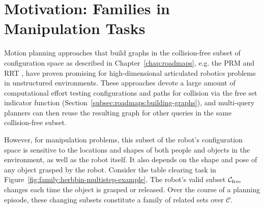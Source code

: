 

%

\section{Motivation: Families in Manipulation Tasks}
\label{sec:family:families-in-manipulation}

Motion planning approaches that build graphs
in the collision-free subset of
configuration space as described in Chapter~\ref{chap:roadmaps},
e.g. the
PRM \citep{kavrakietal1996prm}
and RRT \citep{lavallekuffner1999rrt},
have proven promising
for high-dimensional articulated robotics problems
in unstructured environments.
These approaches devote a large amount of computational effort
testing configurations and paths for collision
via the free set indicator function
(Section~\ref{subsec:roadmaps:building-graphs}),
and multi-query planners can then reuse the resulting graph
for other queries in the same collision-free subset.

However,
for manipulation problems,
this subset of the robot's configuration space
is sensitive to the locations and shapes of
both people and objects in the environment,
as well as the robot itself.
It also depends on the shape and pose of any object
grasped by the robot.
Consider the table clearing task in
Figure~\ref{fig:family:herbbin-multistep-example}.
The robot's valid subset $\mathcal{C}_{\mbox{\scriptsize free}}$
changes each time the object is grasped or released.
Over the course of a planning episode,
these changing subsets constitute a family of related sets over
$\mathcal{C}$.

